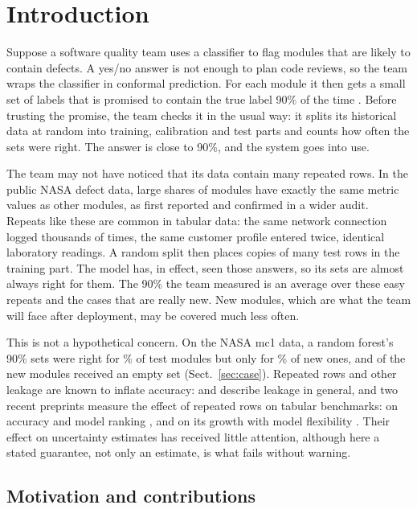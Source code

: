 \section{Introduction}\label{sec:intro}

Suppose a software quality team uses a classifier to flag modules that are likely to contain defects. A yes/no answer is not enough to plan code reviews, so the team wraps the classifier in conformal prediction. For each module it then gets a small set of labels that is promised to contain the true label 90\% of the time \citep{vovk2022}. Before trusting the promise, the team checks it in the usual way: it splits its historical data at random into training, calibration and test parts and counts how often the sets were right. The answer is close to 90\%, and the system goes into use.

The team may not have noticed that its data contain many repeated rows. In the public NASA defect data, large shares of modules have exactly the same metric values as other modules, as \citet{gray2011} first reported and \citet{shepperd2013} confirmed in a wider audit. Repeats like these are common in tabular data: the same network connection logged thousands of times, the same customer profile entered twice, identical laboratory readings. A random split then places copies of many test rows in the training part. The model has, in effect, seen those answers, so its sets are almost always right for them. The 90\% the team measured is an average over these easy repeats and the cases that are really new. New modules, which are what the team will face after deployment, may be covered much less often.

This is not a hypothetical concern. On the NASA mc1 data, a random forest's 90\% sets were right for \NCsMcOneReported{}\% of test modules but only for \NCsMcOneNew{}\% of new ones, and \NToolStdEmpty{} of the new modules received an empty set (Sect.~\ref{sec:case}). Repeated rows and other leakage are known to inflate accuracy: \citet{kaufman2012} and \citet{kapoor2023} describe leakage in general, and two recent preprints measure the effect of repeated rows on tabular benchmarks: on accuracy and model ranking \citep{li2026}, and on its growth with model flexibility \citep{roth2026}. Their effect on uncertainty estimates has received little attention, although here a stated guarantee, not only an estimate, is what fails without warning.

\subsection*{Motivation and contributions}

